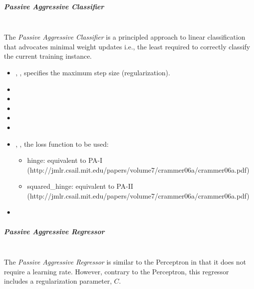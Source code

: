 \subparagraph{Passive Aggressive Classifier}
\mbox{}
\\The \textit{Passive Aggressive Classifier} is a principled approach to linear
classification that advocates minimal weight updates i.e., the least required
to correctly classify the current training instance.
%
\begin{itemize}
  \item {}, , specifies the maximum step size
  (regularization).
  \item {}
  \item {}
  \item {}
  \item {}
  \item \verDescriptionB{}
  \item {}, , the loss function to
  be used:
  \begin{itemize}
    \item hinge: equivalent to PA-I (http://jmlr.csail.mit.edu/papers/volume7/crammer06a/crammer06a.pdf)
    \item squared\_hinge: equivalent to PA-II (http://jmlr.csail.mit.edu/papers/volume7/crammer06a/crammer06a.pdf)
  \end{itemize}

  \item \warmStartDescription{}
\end{itemize}

\subparagraph{Passive Aggressive Regressor}
\mbox{}
\\The \textit{Passive Aggressive Regressor} is similar to the Perceptron in that
it does not require a learning rate.
%
However, contrary to the Perceptron, this regressor includes a regularization
parameter, $C$.

